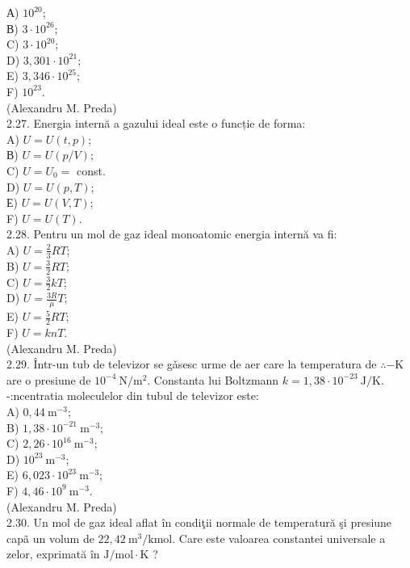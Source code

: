А) $10^{20}$;\\
В) $3 \cdot 10^{26}$;\\
C) $3 \cdot 10^{20}$;\\
D) $3,301 \cdot 10^{21}$;\\
E) $3,346 \cdot 10^{25}$;\\
F) $10^{23}$.\\
(Alexandru M. Preda)\\
2.27. Energia internă a gazului ideal este o funcție de forma:\\
A) $U=U(t, p)$;\\
В) $U=U(p / V)$;\\
C) $U=U_{0}=$ const.\\
D) $U=U(p, T)$;\\
Е) $U=U(V, T)$;\\
F) $U=U(T)$.\\
2.28. Pentru un mol de gaz ideal monoatomic energia internă va fi:\\
A) $U=\frac{2}{3} R T$;\\
B) $U=\frac{3}{2} R T$;\\
C) $U=\frac{3}{2} k T$;\\
D) $U=\frac{3 R}{\mu} T$;\\
E) $U=\frac{5}{2} R T$;\\
F) $U=k n T$.\\
(Alexandru M. Preda)\\
2.29. Într-un tub de televizor se gǎsesc urme de aer care la temperatura de $\therefore-\mathrm{K}$ are o presiune de $10^{-4} \mathrm{~N} / \mathrm{m}^{2}$. Constanta lui Boltzmann $k=1,38 \cdot 10^{-23} \mathrm{~J} / \mathrm{K}$. -:ncentratia moleculelor din tubul de televizor este:\\
A) $0,44 \mathrm{~m}^{-3}$;\\
B) $1,38 \cdot 10^{-21} \mathrm{~m}^{-3}$;\\
C) $2,26 \cdot 10^{16} \mathrm{~m}^{-3}$;\\
D) $10^{23} \mathrm{~m}^{-3}$;\\
E) $6,023 \cdot 10^{23} \mathrm{~m}^{-3}$;\\
F) $4,46 \cdot 10^{9} \mathrm{~m}^{-3}$.\\
(Alexandru M. Preda)\\
2.30. Un mol de gaz ideal aflat în condiţii normale de temperatură şi presiune capã un volum de $22,42 \mathrm{~m}^{3} / \mathrm{kmol}$. Care este valoarea constantei universale a zelor, exprimată în $\mathrm{J} / \mathrm{mol} \cdot \mathrm{K}$ ?\\
